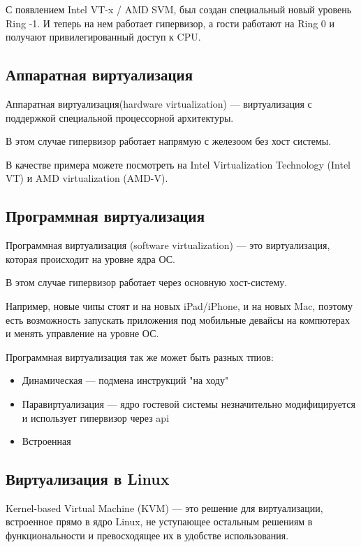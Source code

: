 С появлением Intel VT-x / AMD SVM, был создан специальный новый уровень Ring -1. И теперь на нем работает гипервизор, а гости работают на Ring 0 и получают привилегированный доступ к CPU.

\subsection{Аппаратная виртуализация}
Аппаратная виртуализация(hardware virtualization) --- виртуализация с поддержкой специальной процессорной архитектуры.

В этом случае гипервизор работает напрямую с железоом без хост системы.

В качестве примера можете посмотреть на Intel Virtualization Technology (Intel VT) и AMD virtualization (AMD-V).

\subsection{Программная виртуализация}
Программная виртуализация (software virtualization) --- это виртуализация, которая происходит на уровне ядра ОС.

В этом случае гипервизор работает через основную хост-систему.

Например, новые чипы стоят и на новых iPad/iPhone, и на новых Mac, поэтому есть возможность запускать приложения под мобильные девайсы на компютерах и менять управление на уровне ОС.

Программная виртуализация так же может быть разных тпиов:
\begin{itemize}
  \item Динамическая --- подмена инструкций "на ходу"
  \item Паравиртуализация --- ядро гостевой системы незначительно модифицируется и использует гипервизор через api
  \item Встроенная
\end{itemize}

\subsection{Виртуализация в Linux}
Kernel-based Virtual Machine (KVM) --- это решение для виртуализации, встроенное прямо в ядро Linux, не уступающее остальным решениям в функциональности и превосходящее их в удобстве использования.

